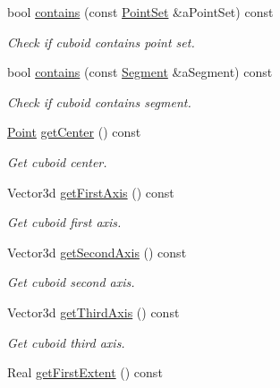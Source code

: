 \begin{DoxyCompactItemize}
bool \hyperlink{classlibrary_1_1math_1_1geom_1_1d3_1_1objects_1_1_cuboid_a7113ad052aa87e7ac691481ceaa6e452}{contains} (const \hyperlink{classlibrary_1_1math_1_1geom_1_1d3_1_1objects_1_1_point_set}{Point\+Set} \&a\+Point\+Set) const
\begin{DoxyCompactList}\small\item\em Check if cuboid contains point set. \end{DoxyCompactList}\item 
bool \hyperlink{classlibrary_1_1math_1_1geom_1_1d3_1_1objects_1_1_cuboid_a91907355c70e38c1877fd2c1ad4c8dba}{contains} (const \hyperlink{classlibrary_1_1math_1_1geom_1_1d3_1_1objects_1_1_segment}{Segment} \&a\+Segment) const
\begin{DoxyCompactList}\small\item\em Check if cuboid contains segment. \end{DoxyCompactList}\item 
\hyperlink{classlibrary_1_1math_1_1geom_1_1d3_1_1objects_1_1_point}{Point} \hyperlink{classlibrary_1_1math_1_1geom_1_1d3_1_1objects_1_1_cuboid_a39e45db60ac6c6662235c94f16d0e3ea}{get\+Center} () const
\begin{DoxyCompactList}\small\item\em Get cuboid center. \end{DoxyCompactList}\item 
Vector3d \hyperlink{classlibrary_1_1math_1_1geom_1_1d3_1_1objects_1_1_cuboid_a39291966f74c9fad884e80c71f30c8b3}{get\+First\+Axis} () const
\begin{DoxyCompactList}\small\item\em Get cuboid first axis. \end{DoxyCompactList}\item 
Vector3d \hyperlink{classlibrary_1_1math_1_1geom_1_1d3_1_1objects_1_1_cuboid_a7586f3d62d4d51e1267466e7768f8754}{get\+Second\+Axis} () const
\begin{DoxyCompactList}\small\item\em Get cuboid second axis. \end{DoxyCompactList}\item 
Vector3d \hyperlink{classlibrary_1_1math_1_1geom_1_1d3_1_1objects_1_1_cuboid_ab89bd1c2cd9a90b63eb0af4c817f0b2a}{get\+Third\+Axis} () const
\begin{DoxyCompactList}\small\item\em Get cuboid third axis. \end{DoxyCompactList}\item 
Real \hyperlink{classlibrary_1_1math_1_1geom_1_1d3_1_1objects_1_1_cuboid_ae7a25e0b147cd1b0f2e3f7fadf98b8c3}{get\+First\+Extent} () const

\end{DoxyCompactItemize}
